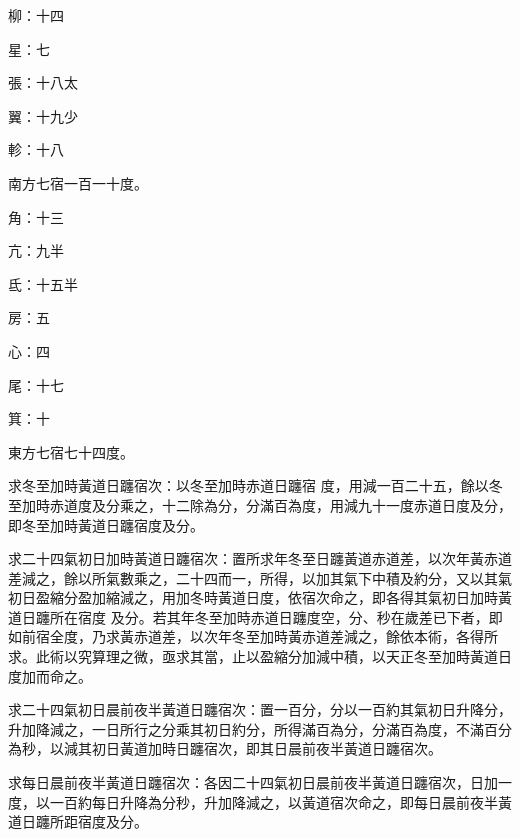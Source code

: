 \begin{pinyinscope}
 柳：十四



 星：七



 張：十八太



 翼：十九少



 軫：十八



 南方七宿一百一十度。



 角：十三



 亢：九半



 氐：十五半



 房：五



 心：四



 尾：十七



 箕：十



 東方七宿七十四度。



 求冬至加時黃道日躔宿次：以冬至加時赤道日躔宿
 度，用減一百二十五，餘以冬至加時赤道度及分乘之，十二除為分，分滿百為度，用減九十一度赤道日度及分，即冬至加時黃道日躔宿度及分。



 求二十四氣初日加時黃道日躔宿次：置所求年冬至日躔黃道赤道差，以次年黃赤道差減之，餘以所氣數乘之，二十四而一，所得，以加其氣下中積及約分，又以其氣初日盈縮分盈加縮減之，用加冬時黃道日度，依宿次命之，即各得其氣初日加時黃道日躔所在宿度
 及分。若其年冬至加時赤道日躔度空，分、秒在歲差已下者，即如前宿全度，乃求黃赤道差，以次年冬至加時黃赤道差減之，餘依本術，各得所求。此術以究算理之微，亟求其當，止以盈縮分加減中積，以天正冬至加時黃道日度加而命之。



 求二十四氣初日晨前夜半黃道日躔宿次：置一百分，分以一百約其氣初日升降分，升加降減之，一日所行之分乘其初日約分，所得滿百為分，分滿百為度，不滿百分為秒，以減其初日黃道加時日躔宿次，即其日晨前夜半黃道日躔宿次。



 求每日晨前夜半黃道日躔宿次：各因二十四氣初日晨前夜半黃道日躔宿次，日加一度，以一百約每日升降為分秒，升加降減之，以黃道宿次命之，即每日晨前夜半黃道日躔所距宿度及分。




\end{pinyinscope}
